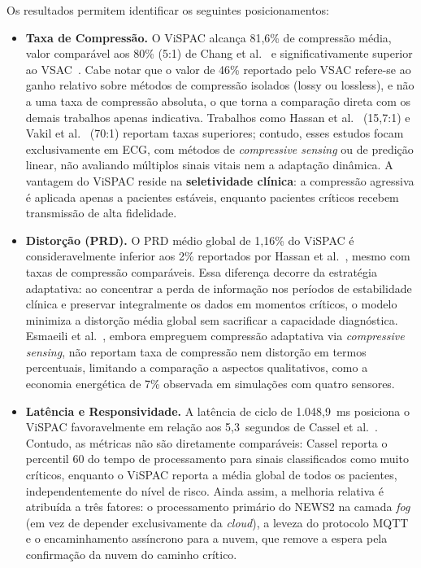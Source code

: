 \documentclass[twoside,english,brazilian]{UNISINOSmonografia}
\begin{document}
Os resultados permitem identificar os seguintes posicionamentos:

\begin{itemize}

\item\textbf{Taxa de Compressão.} O ViSPAC alcança 81,6\% de compressão média, valor comparável aos 80\% (5:1) de Chang et al.~\cite{Chang2024} e significativamente superior ao VSAC~\cite{Andrade2025}. Cabe notar que o valor de 46\% reportado pelo VSAC refere-se ao ganho relativo sobre métodos de compressão isolados (lossy ou lossless), e não a uma taxa de compressão absoluta, o que torna a comparação direta com os demais trabalhos apenas indicativa. Trabalhos como Hassan et al.~\cite{Hassan2024} (15,7:1) e Vakil et al.~\cite{Vakil2024} (70:1) reportam taxas superiores; contudo, esses estudos focam exclusivamente em ECG, com métodos de \textit{compressive sensing} ou de predição linear, não avaliando múltiplos sinais vitais nem a adaptação dinâmica. A vantagem do ViSPAC reside na \textbf{seletividade clínica}: a compressão agressiva é aplicada apenas a pacientes estáveis, enquanto pacientes críticos recebem transmissão de alta fidelidade.

\item\textbf{Distorção (PRD).} O PRD médio global de 1,16\% do ViSPAC é consideravelmente inferior aos 2\% reportados por Hassan et al.~\cite{Hassan2024}, mesmo com taxas de compressão comparáveis. Essa diferença decorre da estratégia adaptativa: ao concentrar a perda de informação nos períodos de estabilidade clínica e preservar integralmente os dados em momentos críticos, o modelo minimiza a distorção média global sem sacrificar a capacidade diagnóstica. Esmaeili et al.~\cite{ESMAEILI2023}, embora empreguem compressão adaptativa via \textit{compressive sensing}, não reportam taxa de compressão nem distorção em termos percentuais, limitando a comparação a aspectos qualitativos, como a economia energética de 7\% observada em simulações com quatro sensores.

\item\textbf{Latência e Responsividade.} A latência de ciclo de 1.048,9~ms posiciona o ViSPAC favoravelmente em relação aos 5,3~segundos de Cassel et al.~\cite{CASSEL2024}. Contudo, as métricas não são diretamente comparáveis: Cassel reporta o percentil 60 do tempo de processamento para sinais classificados como muito críticos, enquanto o ViSPAC reporta a média global de todos os pacientes, independentemente do nível de risco. Ainda assim, a melhoria relativa é atribuída a três fatores: o processamento primário do NEWS2 na camada \textit{fog} (em vez de depender exclusivamente da \textit{cloud}), a leveza do protocolo MQTT e o encaminhamento assíncrono para a nuvem, que remove a espera pela confirmação da nuvem do caminho crítico.


\end{itemize}
\end{document}

